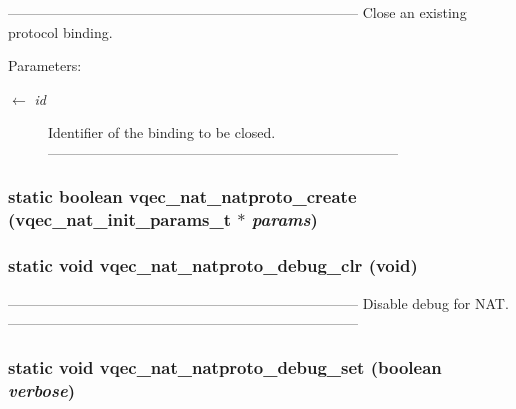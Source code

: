 --------------------------------------------------------------------------- Close an existing protocol binding.

\begin{Desc}
\item[Parameters:]
\begin{description}
\item[\mbox{$\leftarrow$} {\em id}]Identifier of the binding to be closed. --------------------------------------------------------------------------- \end{description}
\end{Desc}
\subsubsection{\setlength{\rightskip}{0pt plus 5cm}static boolean vqec\_\-nat\_\-natproto\_\-create (vqec\_\-nat\_\-init\_\-params\_\-t $\ast$ {\em params})\hspace{0.3cm}{\tt  [static]}}\label{vqec__nat__natproto_8c_2f9ddd2c3ebc439a98e56eef8db82669}


\subsubsection{\setlength{\rightskip}{0pt plus 5cm}static void vqec\_\-nat\_\-natproto\_\-debug\_\-clr (void)\hspace{0.3cm}{\tt  [static]}}\label{vqec__nat__natproto_8c_5f0cfa868caa5bb89e90ededa7a6d8bc}


--------------------------------------------------------------------------- Disable debug for NAT. --------------------------------------------------------------------------- 
\subsubsection{\setlength{\rightskip}{0pt plus 5cm}static void vqec\_\-nat\_\-natproto\_\-debug\_\-set (boolean {\em verbose})\hspace{0.3cm}{\tt  [static]}}\label{vqec__nat__natproto_8c_dc9ff90c920515de978ddd8f9b04bda3}



